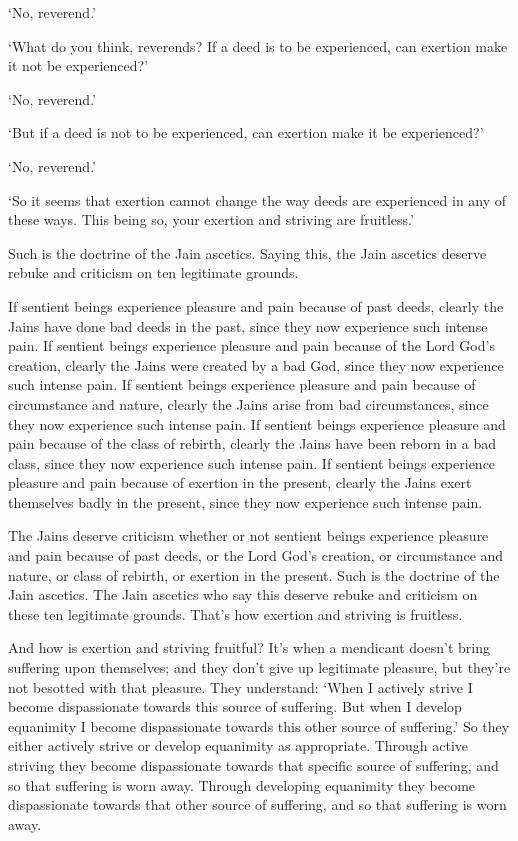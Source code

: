 \documentclass[12pt,openany]{book}%
\begin{document}
‘No, reverend.’ 

‘What do you think, reverends? If a deed is to be experienced, can exertion make it not be experienced?’ 

‘No, reverend.’ 

‘But if a deed is not to be experienced, can exertion make it be experienced?’ 

‘No, reverend.’ 

‘So it seems that exertion cannot change the way deeds are experienced in any of these ways. This being so, your exertion and striving are fruitless.’ 

Such is the doctrine of the Jain ascetics. Saying this, the Jain ascetics deserve rebuke and criticism on ten legitimate grounds. 

If sentient beings experience pleasure and pain because of past deeds, clearly the Jains have done bad deeds in the past, since they now experience such intense pain. If sentient beings experience pleasure and pain because of the Lord God’s creation, clearly the Jains were created by a bad God, since they now experience such intense pain. If sentient beings experience pleasure and pain because of circumstance and nature, clearly the Jains arise from bad circumstances, since they now experience such intense pain. If sentient beings experience pleasure and pain because of the class of rebirth, clearly the Jains have been reborn in a bad class, since they now experience such intense pain. If sentient beings experience pleasure and pain because of exertion in the present, clearly the Jains exert themselves badly in the present, since they now experience such intense pain. 

The Jains deserve criticism whether or not sentient beings experience pleasure and pain because of past deeds, or the Lord God’s creation, or circumstance and nature, or class of rebirth, or exertion in the present. Such is the doctrine of the Jain ascetics. The Jain ascetics who say this deserve rebuke and criticism on these ten legitimate grounds. That’s how exertion and striving is fruitless. 

And how is exertion and striving fruitful? It’s when a mendicant doesn’t bring suffering upon themselves; and they don’t give up legitimate pleasure, but they’re not besotted with that pleasure. They understand: ‘When I actively strive I become dispassionate towards this source of suffering. But when I develop equanimity I become dispassionate towards this other source of suffering.’ So they either actively strive or develop equanimity as appropriate. Through active striving they become dispassionate towards that specific source of suffering, and so that suffering is worn away. Through developing equanimity they become dispassionate towards that other source of suffering, and so that suffering is worn away. 
\end{document}

